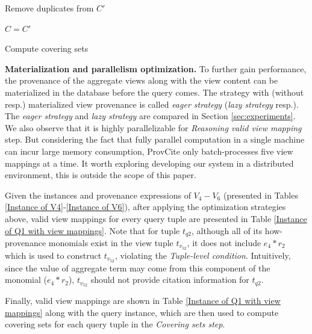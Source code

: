 \begin{example}
\begin{algorithm}[h!]
{    
    
    Remove duplicates from $C'$
    
    $C = C'$
    
 }
 
 \caption{Compute covering sets}
 \label{compute_covering_sets}
 \end{algorithm}




\textbf{Materialization and parallelism optimization.} To further gain performance, the provenance of the aggregate views along with the view content can be materialized in the database before the query comes. The strategy with (without resp.) materialized view provenance is called {\em eager strategy} ({\em lazy strategy} resp.). The {\em eager strategy} and {\em lazy strategy} are compared in Section \ref{sec:experiments}.  We also observe that it is highly parallelizable for {\em Reasoning valid view mapping} step. But considering the fact that fully parallel computation in a single machine can incur large memory consumption, ProvCite only batch-processes five view mappings at a time. It worth exploring developing our system in a distributed environment, this is outside the scope of this paper.


Given the instances and provenance expressions of $V_4-V_6$ (presented in Tables \ref{Instance of V4}-\ref{Instance of V6}), after applying the optimization strategies above, valid view mappings for every query tuple are presented in Table \ref{Instance of Q1 with view mappings}. Note that for tuple $t_{q2}$, although all of its how-provenance monomials exist in the view tuple $t_{v_52}$, it does not include
$e_4*r_2$ which is used to construct $t_{v_52}$, violating the {\em Tuple-level condition}.  Intuitively, since the value of aggregate term may come from this component of the monomial ($e_4*r_2$), $t_{v_52}$ should not provide citation information for $t_{q2}$.


Finally, valid view mappings are shown in Table \ref{Instance of Q1 with view mappings} along with the query instance, which are then used to compute covering sets for each query tuple in the {\em Covering sets step}. 


\end{example}
